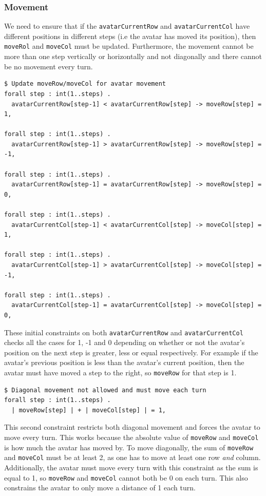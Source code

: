 \documentclass{article}
\begin{document}
\subsubsection{Movement}
We need to ensure that if the \texttt{avatarCurrentRow} and \texttt{avatarCurrentCol} have different positions in different steps (i.e the avatar has moved its position), then \texttt{moveRol} and \texttt{moveCol} must be updated. Furthermore, the movement cannot be more than one step vertically or horizontally and not diagonally and there cannot be no movement every turn.

\begin{lstlisting}[caption={Updating \texttt{moveRow} and \texttt{moveCol}},captionpos=b]
$ Update moveRow/moveCol for avatar movement
forall step : int(1..steps) .
  avatarCurrentRow[step-1] < avatarCurrentRow[step] -> moveRow[step] = 1,

forall step : int(1..steps) .
  avatarCurrentRow[step-1] > avatarCurrentRow[step] -> moveRow[step] = -1,

forall step : int(1..steps) .
  avatarCurrentRow[step-1] = avatarCurrentRow[step] -> moveRow[step] = 0,

forall step : int(1..steps) .
  avatarCurrentCol[step-1] < avatarCurrentCol[step] -> moveCol[step] = 1,

forall step : int(1..steps) .
  avatarCurrentCol[step-1] > avatarCurrentCol[step] -> moveCol[step] = -1,

forall step : int(1..steps) .
  avatarCurrentCol[step-1] = avatarCurrentCol[step] -> moveCol[step] = 0,
\end{lstlisting}
These initial constraints on both \texttt{avatarCurrentRow} and \texttt{avatarCurrentCol} checks all the cases for 1, -1 and 0 depending on whether or not the avatar's position on the next step is greater, less or equal respectively. For example if the avatar's previous position is less than the avatar's current position, then the avatar must have moved a step to the right, so \texttt{moveRow} for that step is 1. 
\\
\begin{lstlisting}[caption={Prevent diagonal movement and force movement every turn}, captionpos=b]
$ Diagonal movement not allowed and must move each turn
forall step : int(1..steps) .
  | moveRow[step] | + | moveCol[step] | = 1,
\end{lstlisting}
This second constraint restricts both diagonal movement and forces the avatar to move every turn. This works because the absolute value of \texttt{moveRow} and \texttt{moveCol} is how much the avatar has moved by. To move diagonally, the sum of \texttt{moveRow} and \texttt{moveCol} must be at least 2, as one has to move at least one row \textit{and} column. Additionally, the avatar must move every turn with this constraint as the sum is equal to 1, so \texttt{moveRow} and \texttt{moveCol} cannot both be 0 on each turn. This also constrains the avatar to only move a distance of 1 each turn.
\end{document}
